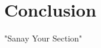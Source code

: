 \documentclass[sigplan,screen]{acmart}
\begin{document}
\section{Conclusion}

"Sanay Your Section"


%
\begin{acks}

\end{acks}

%


\end{document}
